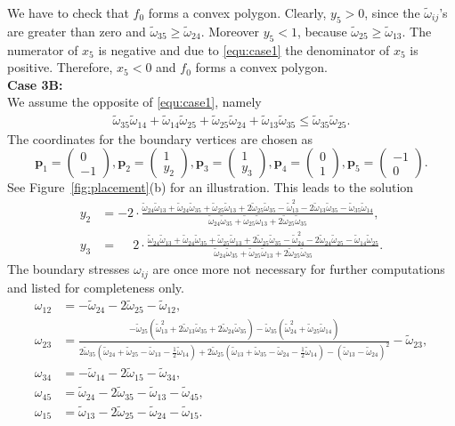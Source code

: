 \documentclass{article}
\theoremstyle{plain} \newtheorem{thm}{Theorem}[section]
\newcommand{\ot}{\tilde{\omega}}
\begin{document}
We have to check that $f_0$ forms a convex polygon. 
Clearly, $y_5>0$, since
the $\ot_{ij}$'s  are greater than zero and $\ot_{35}\geq\ot_{24}$. Moreover 
$y_5<1$, because $\ot_{25}\geq\ot_{13}$. The numerator of
$x_5$ is negative and due to \eqref{equ:case1} the denominator
of $x_5$ is positive. Therefore, $x_5<0$ and $f_0$ forms
a convex polygon.\\[0.5ex]
\textbf{Case 3B:}\\
We assume the opposite of \eqref{equ:case1}, namely 
\begin{align}\label{equ:case2}
 \ot_{35}\ot_{14}+\ot_{14}\ot_{25}+\ot_{25}\ot_{24}+\ot_{13}\ot_{35}\leq\ot_{35}\ot_{25}.
\end{align}
The coordinates for the boundary vertices are chosen as
\[\mathbf{p}_1\!=\!
\begin{pmatrix} 0 \\ -1 \end{pmatrix},\mathbf{p}_2\!=\!\begin{pmatrix} 1 \\ y_2\end{pmatrix},
\mathbf{p}_3\!=\!\begin{pmatrix} 1 \\ y_3 \end{pmatrix} ,\mathbf{p}_4\!=\!\begin{pmatrix} 0 \\
  1\end{pmatrix},\mathbf{p}_5\!=\!\begin{pmatrix} -1 \\ 0\end{pmatrix}.\] 
See Figure~\ref{fig:placement}(b) for an illustration.
This leads to the solution 
\begin{align*}
 y_2& =  -2\cdot \frac{\ot_{24}\ot_{13}+\ot_{24}\ot_{35}+
 \ot_{25}\ot_{13}+2\ot_{25}\ot_{35}-\ot_{13}^2-2\ot_{13}\ot_{35}
 -\ot_{35}\ot_{14}}
 {\ot_{24}\ot_{35}+\ot_{25}\ot_{13}+2\ot_{25}\ot_{35}}, 
 \\
 y_3&=\phantom{-} 2\cdot\frac{\ot_{24}\ot_{13}+\ot_{24}\ot_{35}+
 \ot_{25}\ot_{13}+2\ot_{25}\ot_{35}-\ot_{24}^2-2\ot_{24}\ot_{25}
 -\ot_{14}\ot_{25}}
 {\ot_{24}\ot_{35}+\ot_{25}\ot_{13}+2\ot_{25}\ot_{35}}.
\end{align*}
The boundary stresses   $\omega_{ij}$ are once more  not necessary for further computations and listed for completeness only.
\begin{align*}
\omega_{12} & =  -\ot_{24}-2\ot_{25}-\ot_{12}, \\[1.1ex]
\omega_{23}& =   \frac{-\ot_{25}(\ot_{13}^2+2 \ot_{13}\ot_{35}+2\ot_{24}\ot_{35})
             -\ot_{35}(\ot_{24}^2+\ot_{25}\ot_{14})}
             {2\ot_{35}(\ot_{24}\!+\!\ot_{25}\!-\!\ot_{13}\!-\!\frac{1}{2}\ot_{14})
             \!+\!2\ot_{25}(\ot_{13}\!+\!\ot_{35}\!-\!\ot_{24}\!-\!\frac{1}{2}\ot_{14})
             \!-\!(\ot_{13}\!-\!\ot_{24})^2}-\ot_{23},\\[1.1ex] 
\omega_{34} & =
  -\ot_{14}-2\ot_{15}-\ot_{34},  \\[1.1ex]
\omega_{45} & =
  \ot_{24}-2\ot_{35}-\ot_{13}-\ot_{45}, \\[1.1ex]
\omega_{15} &=
  \ot_{13}-2\ot_{25}-\ot_{24}-\ot_{15}. 
\end{align*}
\end{document}
